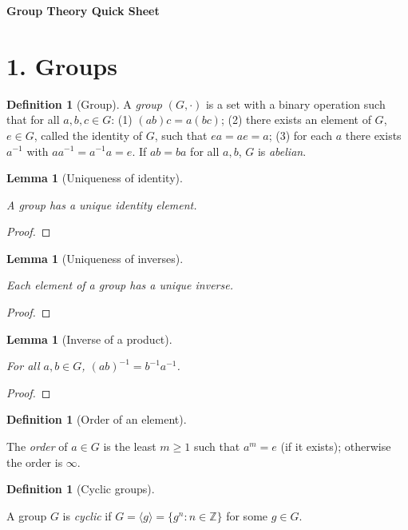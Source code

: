 \documentclass[11pt,letterpaper]{article}
\newtheorem{lemma}[theorem]{Lemma}
\theoremstyle{definition}
\newtheorem{definition}[theorem]{Definition}
\theoremstyle{remark}
\newcommand{\ZZ}{\mathbb{Z}}
\newcommand{\uses}[1]{}
\begin{document}
\begin{center}
  {\Large \textbf{Group Theory Quick Sheet}}\\
  \vspace{2mm}
\end{center}

\section*{1. Groups}

\begin{definition}[Group]\label{def:group}
A \emph{group} $(G,\cdot)$ is a set with a binary operation such that for all $a,b,c\in G$:
(1) $(ab)c=a(bc)$;
(2) there exists an element of $G$, $e\in G$, called the identity of $G$, such that $ea=ae=a$;
(3) for each $a$ there exists $a^{-1}$ with $aa^{-1}=a^{-1}a=e$. If $ab=ba$ for all $a,b$, $G$ is \emph{abelian}.
\end{definition}

\begin{lemma}[Uniqueness of identity]\label{lem:unique_identity}
\uses{def:group}
A group has a unique identity element.
\end{lemma}
\begin{proof}\end{proof}

\begin{lemma}[Uniqueness of inverses]\label{lem:unique_inverse}
\uses{def:group}
Each element of a group has a unique inverse.
\end{lemma}
\begin{proof}\uses{lem:unique_identity}\end{proof}

\begin{lemma}[Inverse of a product]\label{lem:inverse_product}
\uses{def:group}
For all $a,b\in G$, $(ab)^{-1}=b^{-1}a^{-1}$.
\end{lemma}
\begin{proof}\end{proof}

\begin{definition}[Order of an element]\label{def:order}
\uses{def:group}
The \emph{order} of $a\in G$ is the least $m\ge1$ such that $a^m=e$ (if it exists); otherwise the order is $\infty$.
\end{definition}

\begin{definition}[Cyclic groups]\label{def:cyclic_group}
\uses{def:group}
A group $G$ is \emph{cyclic} if $G=\langle g\rangle=\{g^n:n\in\ZZ\}$ for some $g\in G$.
\end{definition}
\end{document}

